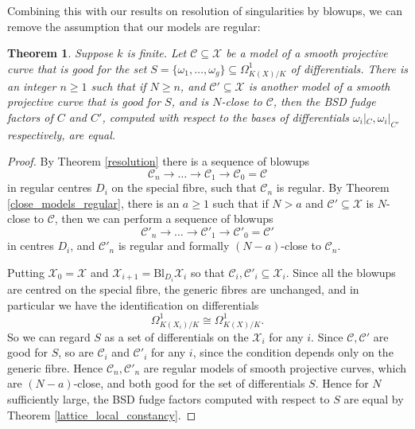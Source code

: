 \documentclass{article}
\theoremstyle{definition}
\theoremstyle{plain}
\newtheorem{thm}[defn]{Theorem}
\theoremstyle{remark}
\newcommand{\bl}{\mathrm{Bl}}
\begin{document}
	Combining this with our results on resolution of singularities by blowups, we can remove the assumption that our models are regular:
	\begin{thm}\label{fudge_local_constancy}
		Suppose $k$ is finite. Let $\mathcal{C}\subseteq \mathcal{X}$ be a model of a smooth projective curve that is good for the set $S = \{\omega_1, \ldots, \omega_g\}\subseteq \Omega^1_{K(X)/K}$ of differentials. There is an integer $n\ge 1$ such that if $N\ge n$, and $\mathcal{C}'\subseteq \mathcal{X}$ is another model of a smooth projective curve that is good for $S$, and is $N$-close to $\mathcal{C}$, then the BSD fudge factors of $C$ and $C'$, computed with respect to the bases of differentials $\omega_i|_C, \omega_i|_{C'}$ respectively, are equal.
	\end{thm}
	\begin{proof}
		By Theorem \ref{resolution} there is a sequence of blowups 
		\[\mathcal{C}_n \to \ldots \to \mathcal{C}_1\to \mathcal{C}_0 = \mathcal{C}\]
		in regular centres $D_i$ on the special fibre, such that $\mathcal{C}_n$ is regular. By Theorem \ref{close_models_regular}, there is an $a\ge 1$ such that if $N> a$ and $\mathcal{C}'\subseteq \mathcal{X}$ is $N$-close to $\mathcal{C}$, then we can perform a sequence of blowups
		\[\mathcal{C}'_n\to \ldots \to \mathcal{C}'_1 \to \mathcal{C}'_0 = \mathcal{C}'\]
		in centres $D_i$, and $\mathcal{C}'_n$ is regular and formally $(N-a)$-close to $\mathcal{C}_n$.
		
		Putting $\mathcal{X}_0 = \mathcal{X}$ and $\mathcal{X}_{i+1} = \bl_{D_i}\mathcal{X}_i$ so that $\mathcal{C}_i,\mathcal{C}'_i\subseteq \mathcal{X}_i$. Since all the blowups are centred on the special fibre, the generic fibres are unchanged, and in particular we have the identification on differentials
		\[\Omega^1_{K(X_i)/K}\cong \Omega^1_{K(X)/K}.\]
		So we can regard $S$ as a set of differentials on the $\mathcal{X}_i$ for any $i$. Since $\mathcal{C}, \mathcal{C}'$ are good for $S$, so are $\mathcal{C}_i$ and $\mathcal{C}'_i$ for any $i$, since the condition depends only on the generic fibre. Hence $\mathcal{C}_n, \mathcal{C}'_n$ are regular models of smooth projective curves, which are $(N-a)$-close, and both good for the set of differentials $S$. Hence for $N$ sufficiently large, the BSD fudge factors computed with respect to $S$ are equal by Theorem \ref{lattice_local_constancy}.
	\end{proof}
	
\end{document}
